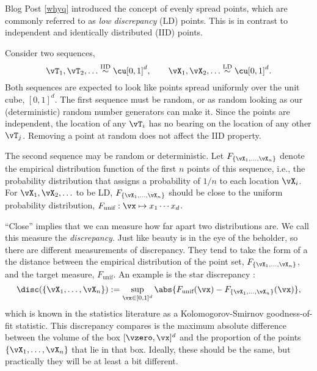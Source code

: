 Blog Post \ref{whyq} introduced the concept of evenly spread points, which are commonly referred to as \emph{low discrepancy} (LD) points.  This is in contrast to independent and identically distributed (IID) points.  

Consider two sequences,
\begin{equation}
    \vT_1, \vT_2, \ldots \overset{\text{IID}}{\sim} \cu[0,1]^d, \qquad \vX_1, \vX_2, \ldots \overset{\text{LD}}{\sim} \cu[0,1]^d.
\end{equation}
Both sequences are expected to look like points spread uniformly over the unit cube, $[0,1]^d$.  
The first sequence must be random, or as random looking as our (deterministic) random number generators can make it.  Since the points are independent, the location of any $\vT_i$ has no bearing on the location of any other $\vT_j$.  Removing a point at random does not affect the IID property.

The second sequence may be random or deterministic.  Let $F_{\{\vX_1, \ldots, \vX_n\}}$ denote the empirical distribution function of the first $n$ points of this sequence, i.e., the probability distribution that assigns a probability of $1/n$ to each location $\vX_i$.  For $\vX_1, \vX_2, \ldots$ to be LD, $F_{\{\vX_1, \ldots, \vX_n\}}$ should be close to the uniform probability distribution, $F_{\text{unif}}: \vx \mapsto x_1 \cdots x_d$.

``Close'' implies that we can measure how far apart two distributions are.  We call this measure the \emph{discrepancy}. Just like beauty is in the eye of the beholder, so there are different measurements of discrepancy.  They tend to take the form of a the distance between the empirical distribution of the point set, $F_{\{\vX_1, \ldots, \vX_n\}}$, and the target measure, $F_{\text{unif}}$. An example is the star discrepancy \cite[(3.16)]{DicEtal14a}:
\begin{equation*}
        \disc(\{\vX_1, \ldots, \vX_n\}) : = \sup_{\vx \in [0,1]^d}  \abs{F_{\text{unif}} (\vx) - F_{\{\vX_1, \ldots, \vX_n\}}(\vx)},
\end{equation*}
which is known in the statistics literature as a Kolomogorov-Smirnov goodness-of-fit statistic.  This discrepancy compares is the maximum absolute difference between the volume of the box $[\vzero,\vx]^d$ and the proportion of the points $\{\vX_1, \ldots, \vX_n\}$ that lie in that box.  Ideally, these should be the same, but practically they will be at least a bit different.

